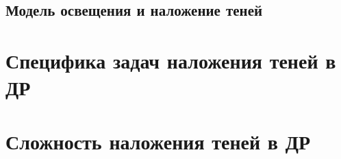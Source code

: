 \subsection{Модель освещения и наложение теней}



\section{Специфика задач наложения теней в ДР}



\section{Сложность наложения теней в ДР}


